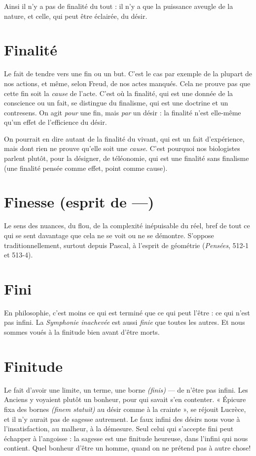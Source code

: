 Ainsi il n’y a pas de finalité du tout : il n’y a que la puissance aveugle de la
nature, et celle, qui peut être éclairée, du désir.

\section{Finalité}
Le fait de tendre vers une fin ou un but. C’est le cas par exemple
de la plupart de nos actions, et même, selon Freud, de nos actes
manqués. Cela ne prouve pas que cette fin soit la {\it cause} de l’acte. C’est où la
finalité, qui est une donnée de la conscience ou un fait, se distingue du finalisme,
qui est une doctrine et un contresens. On agit {\it pour} une fin, mais {\it par} un
désir : la finalité n’est elle-même qu’un effet de l'efficience du désir.

On pourrait en dire autant de la finalité du vivant, qui est un fait d’expérience,
mais dont rien ne prouve qu’elle soit une {\it cause}. C’est pourquoi nos biologistes
parlent plutôt, pour la désigner, de téléonomie, qui est une finalité sans
finalisme (une finalité pensée comme effet, point comme cause).

\section{Finesse (esprit de —)}
Le sens des nuances, du flou, de la complexité
inépuisable du réel, bref de tout ce qui se sent
davantage que cela ne se voit ou ne se démontre. S’oppose traditionnellement,
surtout depuis Pascal, à l'esprit de géométrie ({\it Pensées}, 512-1 et 513-4).

\section{Fini}
En philosophie, c’est moins ce qui est terminé que ce qui peut l'être :
ce qui n’est pas infini. La {\it Symphonie inachevée} est aussi {\it finie} que toutes
les autres. Et nous sommes voués à la finitude bien avant d’être morts.

\section{Finitude}
Le fait d’avoir une limite, un terme, une borne {\it (finis)} — de n’être
pas infini. Les Anciens y voyaient plutôt un bonheur, pour qui
savait s’en contenter. « Épicure fixa des bornes {\it (finem statuit)} au désir comme à
la crainte », se réjouit Lucrèce, et il n’y aurait pas de sagesse autrement. Le faux
infini des désirs nous voue à l’insatisfaction, au malheur, à la démesure. Seul
celui qui s’accepte fini peut échapper à l'angoisse : la sagesse est une finitude
heureuse, dans l'infini qui nous contient. Quel bonheur d’être un homme,
quand on ne prétend pas à autre chose!

